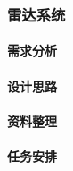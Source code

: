 \subsubsection{雷达系统}

    \paragraph{需求分析}
    
    \paragraph{设计思路}
    
    \paragraph{资料整理}
    
    \paragraph{任务安排}
    